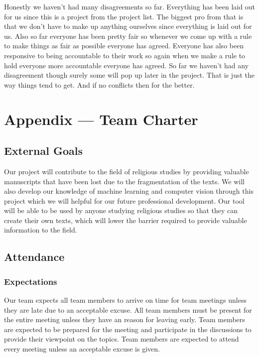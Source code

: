 \documentclass{article}
\begin{document}
\hspace{2em} Honestly we haven’t had many disagreements so far. Everything has been laid out for us since this is a project from the project list. The biggest pro from that is that we don’t have to make up anything ourselves since everything is laid out for us. Also so far everyone has been pretty fair so whenever we come up with a rule to make things as fair as possible everyone has agreed. Everyone has also been responsive to being accountable to their work so again when we make a rule to hold everyone more accountable everyone has agreed. So far we haven’t had any disagreement though surely some will pop up later in the project. That is just the way things tend to get. And if no conflicts then for the better.


\newpage{}

\section*{Appendix --- Team Charter}


\subsection*{External Goals}

Our project will contribute to the field of religious studies by providing valuable manuscripts that have been lost due to the fragmentation of the texts. We will also develop our knowledge 
of machine learning and computer vision through this project which we will helpful for our future professional development. Our tool will be able to be used by anyone studying 
religious studies so that they can create their own texts, which will lower the barrier required to provide valuable information to the field.

\subsection*{Attendance}

\subsubsection*{Expectations}

Our team expects all team members to arrive on time for team meetings unless they are late due to an acceptable excuse. All team members must be present for the entire meeting unless they have an reason for leaving early. 
Team members are expected to be prepared for the meeting and participate in the discussions to provide their viewpoint on the topics. Team members are expected to attend every meeting unless an acceptable excuse is given.
\end{document}
